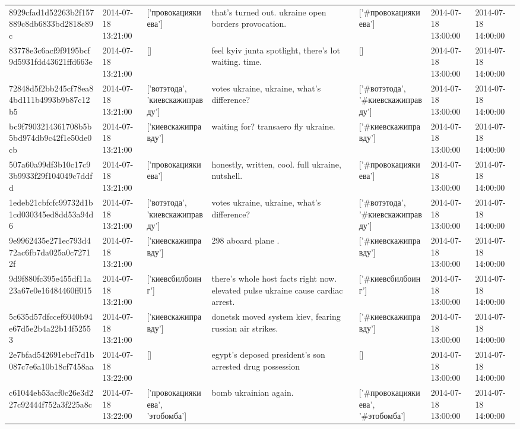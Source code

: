 \begin{tabular}{lllllll}
8929cfad1d52263b2f157889c8db6833bd2818c89c & 2014-07-18 13:21:00 & ['провокациякиева'] & that's turned out. ukraine open borders provocation. & ['#провокациякиева'] & 2014-07-18 13:00:00 & 2014-07-18 14:00:00 \\
83778e3c6acf9f9195bcf9d5931fdd43621ffd663e & 2014-07-18 13:21:00 & [] & feel kyiv junta spotlight, there's lot waiting. time. & [] & 2014-07-18 13:00:00 & 2014-07-18 14:00:00 \\
72848d5f2bb245cf78ea84bd111b4993b9b87c12b5 & 2014-07-18 13:21:00 & ['вотэтода', 'киевскажиправду'] & votes ukraine, ukraine, what's difference? & ['#вотэтода', '#киевскажиправду'] & 2014-07-18 13:00:00 & 2014-07-18 14:00:00 \\
bc9f7903214361708b5b5bd974db9c42f1e50de0cb & 2014-07-18 13:21:00 & ['киевскажиправду'] & waiting for? transaero fly ukraine. & ['#киевскажиправду'] & 2014-07-18 13:00:00 & 2014-07-18 14:00:00 \\
507a60a99df3b10c17c93b9933f29f104049c7ddfd & 2014-07-18 13:21:00 & ['провокациякиева'] & honestly, written, cool. full ukraine, nutshell. & ['#провокациякиева'] & 2014-07-18 13:00:00 & 2014-07-18 14:00:00 \\
1edeb21cbfcfc99732d1b1cd030345ed8dd53a94d6 & 2014-07-18 13:21:00 & ['вотэтода', 'киевскажиправду'] & votes ukraine, ukraine, what's difference? & ['#вотэтода', '#киевскажиправду'] & 2014-07-18 13:00:00 & 2014-07-18 14:00:00 \\
9e9962435e271ec793d472ac6fb7da025a0c72712f & 2014-07-18 13:21:00 & ['киевскажиправду'] & 298 aboard plane . & ['#киевскажиправду'] & 2014-07-18 13:00:00 & 2014-07-18 14:00:00 \\
9d9f880fc395e455df11a23a67e0e16484460ff015 & 2014-07-18 13:21:00 & ['киевсбилбоинг'] & there's whole host facts right now. elevated pulse ukraine cause cardiac arrest. & ['#киевсбилбоинг'] & 2014-07-18 13:00:00 & 2014-07-18 14:00:00 \\
5c635d57dfccef6040b94e67d5e2b4a22b14f52553 & 2014-07-18 13:21:00 & ['киевскажиправду'] & donetsk moved system kiev, fearing russian air strikes. & ['#киевскажиправду'] & 2014-07-18 13:00:00 & 2014-07-18 14:00:00 \\
2e7bfad542691ebcf7d1b087c7e6a10b18cf7458aa & 2014-07-18 13:22:00 & [] & egypt's deposed president's son arrested drug possession & [] & 2014-07-18 13:00:00 & 2014-07-18 14:00:00 \\
c61044eb53acf0c26e3d227c92444f752a3f225a8c & 2014-07-18 13:22:00 & ['провокациякиева', 'этобомба'] & bomb ukrainian again. & ['#провокациякиева', '#этобомба'] & 2014-07-18 13:00:00 & 2014-07-18 14:00:00 \\

\end{tabular}
